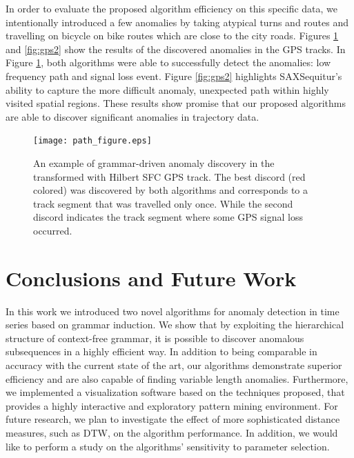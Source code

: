 \documentclass{llncs}
\begin{document}
In order to evaluate the proposed algorithm efficiency on this specific data, we intentionally introduced a few anomalies by taking atypical turns and routes and travelling on bicycle on bike routes which are close to the city roads. Figures \ref{fig:gps} and \ref{fig:gps2} show the results of the discovered anomalies in the GPS tracks. In Figure \ref{fig:gps}, both algorithms were able to successfully detect the anomalies: low frequency path and signal loss event. Figure \ref{fig:gps2} highlights SAXSequitur's ability to capture the more difficult anomaly, unexpected path within highly visited spatial regions. These results show promise that our proposed algorithms are able to discover significant anomalies in trajectory data. 

\begin{figure}[t]
   \centering
   \vspace{-0.5cm}
   \texttt{[image: path\_figure.eps]}
   \caption{An example of grammar-driven anomaly discovery in the transformed with Hilbert SFC GPS track. The best discord (red colored) was discovered by both algorithms and corresponds to a track segment that was travelled only once. While the second discord indicates the track segment where some GPS signal loss occurred.}
   \label{fig:gps}
   \vspace{-0.35cm}   
\end{figure}

\section{Conclusions and Future Work}
In this work we introduced two novel algorithms for anomaly detection in time series based on grammar induction. We show that by exploiting the hierarchical structure of context-free grammar, it is possible to discover anomalous subsequences in a highly efficient way. In addition to being comparable in accuracy with the current state of the art, our algorithms demonstrate superior efficiency and are also capable of finding variable length anomalies. Furthermore, we implemented a visualization software based on the techniques proposed, that provides a highly interactive and exploratory pattern mining environment. For future research, we plan to investigate the effect of more sophisticated distance measures, such as DTW, on the algorithm performance. In addition, we would like to perform a study on the algorithms' sensitivity to parameter selection.  
\end{document}
